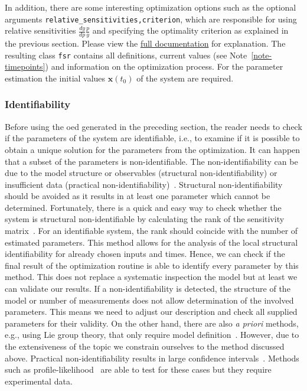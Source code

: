 \documentclass[graybox]{svmult}
\newcommand{\mbx}{\mathbf{x}}
\begin{document}
In addition, there are some interesting optimization options such as the optional arguments \texttt{relative_sensitivities,criterion}, which are responsible for using relative sensitivities $\tfrac{dy}{dp}\tfrac{p}{y}$ and specifying the optimality criterion as explained in the previous section.
Please view the \href{https://spatial-systems-biology-freiburg.github.io/FisInMa/}{full documentation} for explanation.
The resulting class \texttt{fsr} contains all definitions, current values (see Note~\ref{note-timepoints}) and information on the optimization process.
For the parameter estimation the initial values $\mbx(t_0)$ of the system are required.
%
\subsubsection{Identifiability}
Before using the \acl{oed} generated in the preceding section, the reader needs to check if the parameters of the system are identifiable, i.e., to examine if it is possible to obtain a unique solution for the parameters from the optimization.
It can happen that a subset of the parameters is non-identifiable.
The non-identifiability can be due to the model structure or observables (structural non-identifiability) or insufficient data (practical non-identifiability)~\cite{guillaume_introductory_2019, wieland_structural_2021, walter_identifiability_1996}.
Structural non-identifiability should be avoided as it results in at least one parameter which cannot be determined.
Fortunately, there is a quick and easy way to check whether the system is structural non-identifiable by calculating the rank of the sensitivity matrix~\cite{miao_identifiability_2011, stigter_fast_2015}.
For an identifiable system, the rank should coincide with the number of estimated parameters.
This method allows for the analysis of the local structural identifiability for already chosen inputs and times.
Hence, we can check if the final result of the optimization routine is able to identify every parameter by this method.
This does not replace a systematic inspection the model but at least we can validate our results.
If a non-identifiability is detected, the structure of the model or number of measurements does not allow determination of the involved parameters.
This means we need to adjust our description and check all supplied parameters for their validity.
On the other hand, there are also {\it a priori} methods, e.g., using Lie group theory, that only require model definition~\cite{wieland_structural_2021}.
However, due to the extensiveness of the topic we constrain ourselves to the method discussed above.
Practical non-identifiability results in large confidence intervals~\cite{holmberg_practical_1982, miao_identifiability_2011, kreutzProfileLikelihood2013}.
Methods such as profile-likelihood~\cite{wieland_structural_2021} are able to test for these cases but they require experimental data.
%
\end{document}
